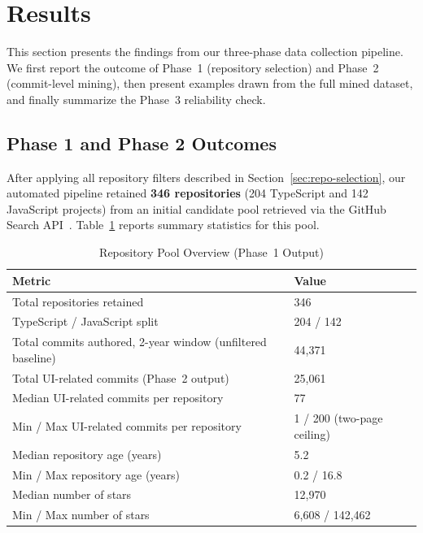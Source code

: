 \documentclass{article}
\begin{document}
\newpage
\section{Results}
\label{sec:results}

This section presents the findings from our three-phase data collection
pipeline. We first report the outcome of Phase~1 (repository selection)
and Phase~2 (commit-level mining), then present examples drawn from the
full mined dataset, and finally summarize the Phase~3 reliability check.

\subsection{Phase 1 and Phase 2 Outcomes}

After applying all repository filters described in Section~\ref{sec:repo-selection}, our
automated pipeline retained \textbf{346 repositories} (204 TypeScript and
142 JavaScript projects) from an initial candidate pool retrieved via the
GitHub Search API~\cite{github2024}. Table~\ref{tab:repo_overview} reports
summary statistics for this pool.

\begin{table}[htbp]
\centering
\caption{Repository Pool Overview (Phase~1 Output)}
\label{tab:repo_overview}
\begin{tabularx}{\textwidth}{l X}
\toprule
\textbf{Metric} & \textbf{Value} \\
\midrule
Total repositories retained & 346 \\
TypeScript / JavaScript split & 204 / 142 \\
Total commits authored, 2-year window (unfiltered baseline) & 44,371 \\
Total UI-related commits (Phase~2 output) & 25,061 \\
Median UI-related commits per repository & 77 \\
Min / Max UI-related commits per repository & 1 / 200 (two-page ceiling) \\
Median repository age (years) & 5.2 \\
Min / Max repository age (years) & 0.2 / 16.8 \\
Median number of stars & 12,970 \\
Min / Max number of stars & 6,608 / 142,462 \\
\bottomrule
\end{tabularx}
\end{table}
\end{document}
